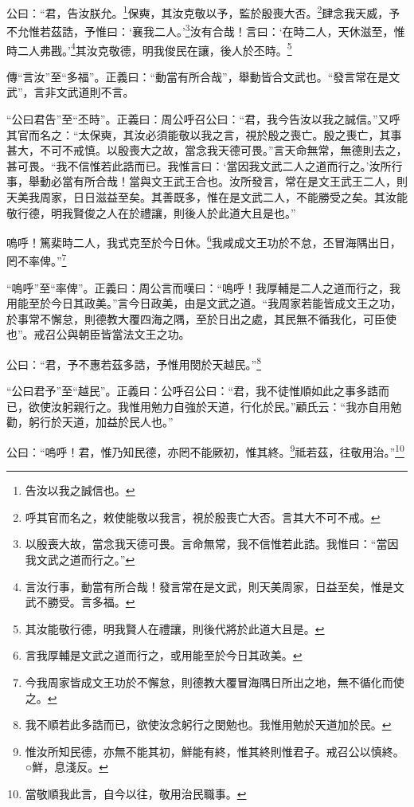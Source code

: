 公曰：“君，告汝朕允。\footnote{告汝以我之誠信也。}保奭，其汝克敬以予，監於殷喪大否。\footnote{呼其官而名之，敕使能敬以我言，視於殷喪亡大否。言其大不可不戒。}肆念我天威，予不允惟若茲誥，予惟曰：‘襄我二人。’\footnote{以殷喪大故，當念我天德可畏。言命無常，我不信惟若此誥。我惟曰：“當因我文武之道而行之。”}汝有合哉！言曰：‘在時二人，天休滋至，惟時二人弗戡。’\footnote{言汝行事，動當有所合哉！發言常在是文武，則天美周家，日益至矣，惟是文武不勝受。言多福。}其汝克敬德，明我俊民在讓，後人於丕時。\footnote{其汝能敬行德，明我賢人在禮讓，則後代將於此道大且是。}


{\noindent\zhuan{}\fzbyks 傳“言汝”至“多福”。正義曰：“動當有所合哉”，舉動皆合文武也。“發言常在是文武”，言非文武道則不言。 \par}

{\noindent\shu{}\fzkt “公曰君告”至“丕時”。正義曰：周公呼召公曰：“君，我今告汝以我之誠信。”又呼其官而名之：“太保奭，其汝必須能敬以我之言，視於殷之喪亡。殷之喪亡，其事甚大，不可不戒慎。以殷喪大之故，當念我天德可畏。”言天命無常，無德則去之，甚可畏。“我不信惟若此誥而已。我惟言曰：‘當因我文武二人之道而行之。’汝所行事，舉動必當有所合哉！當與文王武王合也。汝所發言，常在是文王武王二人，則天美我周家，日日滋益至矣。其善既多，惟在是文武二人，不能勝受之矣。其汝能敬行德，明我賢俊之人在於禮讓，則後人於此道大且是也。” \par}

嗚呼！篤棐時二人，我式克至於今日休。\footnote{言我厚輔是文武之道而行之，或用能至於今日其政美。}我咸成文王功於不怠，丕冒海隅出日，罔不率俾。”\footnote{今我周家皆成文王功於不懈怠，則德教大覆冒海隅日所出之地，無不循化而使之。}

{\noindent\shu{}\fzkt “嗚呼”至“率俾”。正義曰：周公言而嘆曰：“嗚呼！我厚輔是二人之道而行之，我用能至於今日其政美。”言今日政美，由是文武之道。“我周家若能皆成文王之功，於事常不懈怠，則德教大覆四海之隅，至於日出之處，其民無不循我化，可臣使也”。戒召公與朝臣皆當法文王之功。 \par}

公曰：“君，予不惠若茲多誥，予惟用閔於天越民。”\footnote{我不順若此多誥而已，欲使汝念躬行之閔勉也。我惟用勉於天道加於民。}

{\noindent\shu{}\fzkt “公曰君予”至“越民”。正義曰：公呼召公曰：“君，我不徒惟順如此之事多誥而已，欲使汝躬親行之。我惟用勉力自強於天道，行化於民。”顧氏云：“我亦自用勉勸，躬行於天道，加益於民人也。” \par}

公曰：“嗚呼！君，惟乃知民德，亦罔不能厥初，惟其終。\footnote{惟汝所知民德，亦無不能其初，鮮能有終，惟其終則惟君子。戒召公以慎終。○鮮，息淺反。}祗若茲，往敬用治。”\footnote{當敬順我此言，自今以往，敬用治民職事。}


